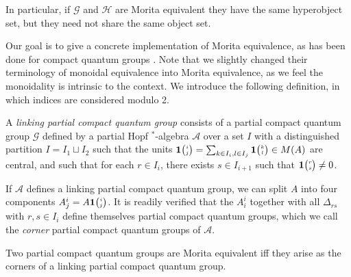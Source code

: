 In particular, if $\mathscr{G}$ and $\mathscr{H}$ are Morita equivalent they have the same hyperobject set, but they need not share the same object set.

Our goal is to give a concrete implementation of Morita equivalence, as has been done for compact quantum groups \cite{BDV1}. Note that we slightly changed their terminology of monoidal equivalence into Morita equivalence, as we feel the monoidality is intrinsic to the context. We introduce the following definition, in which indices are considered modulo 2. 

\begin{Def} A \emph{linking partial compact quantum group} consists of a partial compact quantum group $\mathscr{G}$ defined by a partial Hopf $^*$-algebra $\mathscr{A}$ over a set $I$ with a distinguished partition $I = I_1\sqcup I_2$ such that the units $\mathbf{1}{\tiny {\begin{pmatrix} i\\j\end{pmatrix}}} = \sum_{k\in I_i,l\in I_j} \mathbf{1}{\tiny {\begin{pmatrix} k\\l\end{pmatrix}}} \in M(A)$ are central, and such that for each $r\in I_i$, there exists $s\in I_{i+1}$ such that $\mathbf{1}{\tiny {\begin{pmatrix} r\\s\end{pmatrix}}}\neq 0$.
\end{Def}

If $\mathscr{A}$ defines a linking partial compact quantum group, we can split $A$ into four components $A^i_j = A\mathbf{1}{\tiny {\begin{pmatrix} i\\j\end{pmatrix}}}$. It is readily verified that the $A^i_i$ together with all $\Delta_{rs}$ with $r,s \in I_i$ define themselves partial compact quantum groups, which we call the \emph{corner} partial compact quantum groups of $\mathscr{A}$. 

\begin{Prop} Two partial compact quantum groups are Morita equivalent iff they arise as the corners of a linking partial compact quantum group.
\end{Prop}

